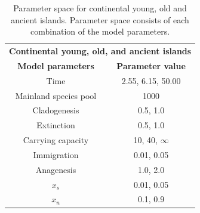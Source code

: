 \begin{table}[ht]
    \centering
    \caption{Parameter space for continental young, old and ancient islands. Parameter space consists of each combination of the model parameters.}
    \begin{tabular}{ c | c }
        \multicolumn{2}{c}{\textbf{Continental young, old, and ancient islands}} \\
        \textbf{Model parameters} & \textbf{Parameter value} \\ 
        \hline
        \hline
        Time & 2.55, 6.15, 50.00 \\
        \hline
        Mainland species pool & 1000 \\
        \hline
        Cladogenesis & 0.5, 1.0 \\
        \hline
        Extinction & 0.5, 1.0 \\
        \hline
        Carrying capacity & 10, 40, $\infty$ \\
        \hline
        Immigration & 0.01, 0.05 \\
        \hline
        Anagenesis & 1.0, 2.0 \\
        \hline
        $x_s$ & 0.01, 0.05 \\
        \hline
        $x_n$ & 0.1, 0.9 \\
    \end{tabular}
    \label{tab:continental}
\end{table}

